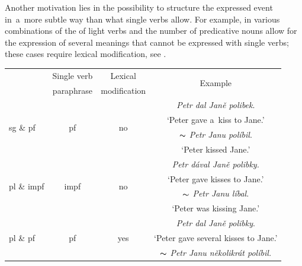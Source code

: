 \documentclass[output=paper
,modfonts
,nonflat]{langsci/langscibook}
\begin{document}
Another motivation lies in the possibility to structure the expressed event 
in~a~more subtle way than what single verbs allow. For example, in  various 
combinations of the  of light verbs and the number of 
predicative nouns allow for the expression of several meanings that cannot be 
expressed with single verbs; these cases require lexical modification, see 
.

\begin{table}[tb]
	\centering
	\begin{tabular}{lccc}
	 \lsptoprule
	   \multirow{2}{*}{LVC} & Single verb & Lexical        & \multirow{2}{*}{Example\footnotemark} \\
	                     & paraphrase &  modification   &   \\ \midrule
		\multirow{4}{*}{sg \& pf}   & \multirow{4}{*}{pf} &  \multirow{4}{*}{no} &  \textit{Petr dal Janě polibek}. \\ 
		                            &                     &                      &  `Peter gave a~kiss to Jane.' \\
		                            &                     &                      &   $\thicksim$ \textit{Petr Janu políbil}. \\
		                            &                     &                      &   `Peter kissed Jane.'\\ \midrule
 		\multirow{4}{*}{pl \& impf} & \multirow{4}{*}{impf} & \multirow{4}{*}{no}     &  \textit{Petr dával Janě polibky.} \\
 		                            &                       &                         & `Peter gave kisses to Jane.' \\ 
                                  &                       &                         & $\thicksim$ \textit{Petr Janu líbal}. \\
                                  &                       &                         & `Peter was kissing Jane.' \\ \midrule  		                                                                                  
		\multirow{4}{*}{pl \& pf}  & \multirow{4}{*}{pf}  & \multirow{4}{*}{yes}    &    \textit{Petr dal Janě polibky}. \\
		                            &                       &                        &    `Peter gave several kisses to Jane.' \\ 
                                  &                       &                        &     $\thicksim$ \textit{Petr Janu několikrát políbil.} \\

\end{tabular}
\end{table}
\end{document}
